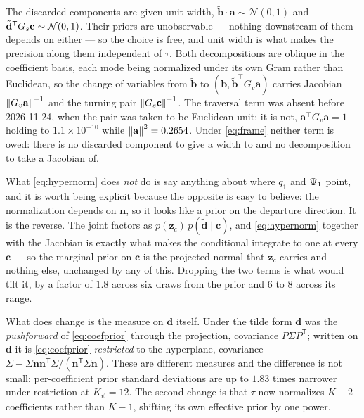 \documentclass[11pt]{article}
\theoremstyle{plain}
\begin{document}
The discarded components are given unit width, $\tilde{\mathbf{b}}\!\cdot\!\mathbf{a} \sim
\mathcal{N}(0,1)$ and $\tilde{\mathbf{d}}^{\mathsf T}G_{s}\mathbf{c} \sim
\mathcal{N}(0,1)$. Their priors are unobservable --- nothing downstream of them depends on
either --- so the choice is free, and unit width is what makes the precision along them
independent of $\tau$. Both decompositions are oblique in the coefficient basis, each mode
being normalized under its own Gram rather than Euclidean, so the change of variables from
$\tilde{\mathbf{b}}$ to $(\mathbf{b}, \tilde{\mathbf{b}}^{\top}G_{v}\mathbf{a})$ carries
Jacobian $\left\| G_{v}\mathbf{a} \right\|^{-1}$ and the turning pair $\left\| G_{s}\mathbf{c} \right\|^{-1}$.
The traversal term was absent before 2026-11-24, when the pair was taken to be Euclidean-unit;
it is not, $\mathbf{a}^{\top}G_{v}\mathbf{a} = 1$ holding to $1.1\times10^{-10}$ while
$\left\| \mathbf{a} \right\|^{2} = 0.2654$. Under \eqref{eq:frame} neither term is owed: there is no
discarded component to give a width to and no decomposition to take a Jacobian of.

What \eqref{eq:hypernorm} does \emph{not} do is say anything about where $q_{1}$ and
$\Psi_{1}$ point, and it is worth being explicit because the opposite is easy to
believe: the normalization depends on $\mathbf{n}$, so it looks like a prior on the
departure direction. It is the reverse. The joint factors as
$p(\mathbf{z}_{c})\,p(\tilde{\mathbf{d}} \mid \mathbf{c})$, and
\eqref{eq:hypernorm} together with the Jacobian is exactly what makes the conditional
integrate to one at every $\mathbf{c}$ --- so the marginal prior on $\mathbf{c}$ is the
projected normal that $\mathbf{z}_{c}$ carries and nothing else, unchanged by any of this.
Dropping the two terms is what would tilt it, by a factor of $1.8$ across six draws from
the prior and $6$ to $8$ across its range.

What does change is the measure on $\mathbf{d}$ itself. Under the tilde form
$\mathbf{d}$ was the \emph{pushforward} of \eqref{eq:coefprior} through the projection,
covariance $P\Sigma P^{\mathsf T}$; written on $\mathbf{d}$ it is \eqref{eq:coefprior}
\emph{restricted} to the hyperplane, covariance
$\Sigma - \Sigma\mathbf{n}\mathbf{n}^{\mathsf T}\Sigma / (\mathbf{n}^{\mathsf T}\Sigma\mathbf{n})$.
These are different measures and the difference is not small: per-coefficient prior
standard deviations are up to $1.83$ times narrower under restriction at $K_{\psi} = 12$.
The second change is that $\tau$ now normalizes $K-2$ coefficients rather than $K-1$,
shifting its own effective prior by one power.
\end{document}
